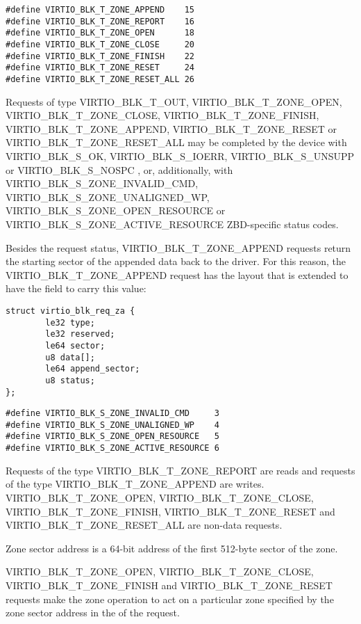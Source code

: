 \begin{lstlisting}
#define VIRTIO_BLK_T_ZONE_APPEND    15
#define VIRTIO_BLK_T_ZONE_REPORT    16
#define VIRTIO_BLK_T_ZONE_OPEN      18
#define VIRTIO_BLK_T_ZONE_CLOSE     20
#define VIRTIO_BLK_T_ZONE_FINISH    22
#define VIRTIO_BLK_T_ZONE_RESET     24
#define VIRTIO_BLK_T_ZONE_RESET_ALL 26
\end{lstlisting}

Requests of type VIRTIO_BLK_T_OUT, VIRTIO_BLK_T_ZONE_OPEN,
VIRTIO_BLK_T_ZONE_CLOSE, VIRTIO_BLK_T_ZONE_FINISH, VIRTIO_BLK_T_ZONE_APPEND,
VIRTIO_BLK_T_ZONE_RESET or VIRTIO_BLK_T_ZONE_RESET_ALL may be completed by the
device with VIRTIO_BLK_S_OK, VIRTIO_BLK_S_IOERR, VIRTIO_BLK_S_UNSUPP or
VIRTIO_BLK_S_NOSPC , or, additionally, with
VIRTIO_BLK_S_ZONE_INVALID_CMD, VIRTIO_BLK_S_ZONE_UNALIGNED_WP,
VIRTIO_BLK_S_ZONE_OPEN_RESOURCE or VIRTIO_BLK_S_ZONE_ACTIVE_RESOURCE ZBD-specific
status codes.

Besides the request status, VIRTIO_BLK_T_ZONE_APPEND requests return the
starting sector of the appended data back to the driver. For this reason,
the VIRTIO_BLK_T_ZONE_APPEND request has the layout that is extended to have
the  field to carry this value:

\begin{lstlisting}
struct virtio_blk_req_za {
        le32 type;
        le32 reserved;
        le64 sector;
        u8 data[];
        le64 append_sector;
        u8 status;
};
\end{lstlisting}

\begin{lstlisting}
#define VIRTIO_BLK_S_ZONE_INVALID_CMD     3
#define VIRTIO_BLK_S_ZONE_UNALIGNED_WP    4
#define VIRTIO_BLK_S_ZONE_OPEN_RESOURCE   5
#define VIRTIO_BLK_S_ZONE_ACTIVE_RESOURCE 6
\end{lstlisting}

Requests of the type VIRTIO_BLK_T_ZONE_REPORT are reads and requests of the type
VIRTIO_BLK_T_ZONE_APPEND are writes. VIRTIO_BLK_T_ZONE_OPEN,
VIRTIO_BLK_T_ZONE_CLOSE, VIRTIO_BLK_T_ZONE_FINISH, VIRTIO_BLK_T_ZONE_RESET and
VIRTIO_BLK_T_ZONE_RESET_ALL are non-data requests.

Zone sector address is a 64-bit address of the first 512-byte sector of the
zone.

VIRTIO_BLK_T_ZONE_OPEN, VIRTIO_BLK_T_ZONE_CLOSE, VIRTIO_BLK_T_ZONE_FINISH and
VIRTIO_BLK_T_ZONE_RESET requests make the zone operation to act on a particular
zone specified by the zone sector address in the  of the request.


